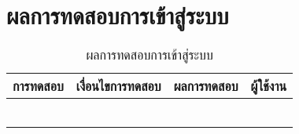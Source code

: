 \section{ผลการทดสอบการเข้าสู่ระบบ}
\begin{table}[H]
	\caption{ผลการทดสอบการเข้าสู่ระบบ}
    \centering	
	\label{tab:test3}
    \begin{tabular}{ | p{4cm} | p{4cm} | p{4cm} | p{2cm} | }
		\hline
	\multicolumn{1}{|c|}{การทดสอบ} & \multicolumn{1}{c|}{เงื่อนไขการทดสอบ} & \multicolumn{1}{c|}{ผลการทดสอบ} & \multicolumn{1}{c|}{ผู้ใช้งาน}                             \\ \hline
	\setstretch{1.0}{ทดสอบการเข้าสู่ระบบ}
	& \setstretch{1.0}{ผู้ใช้เข้ามาในหน้าเข้าสู่ระบบ}
	& \setstretch{1.0}{ระบบแสดงหน้าเข้าสู่ระบบ} 
	&\setstretch{1.0}{\begin{flushleft}ผู้ใช้งาน\end{flushleft}} \\ \cline{2-3} 
	& \setstretch{1.0}{ผู้ใช้กดปุ่มเข้าสู่ระบบ โดยไม่กรอก username และ password } 
	& \setstretch{1.0}{ระบบแสดงข้อความบอกผู้ใช้ว่า “กรุณากรอกชื่อผู้ใช้หรือรหัสผ่านให้ถูกต้อง”} 
	&\setstretch{1.0}{}\\ \cline{2-3} 
	& \setstretch{1.0}{ผู้ใช้กดเข้าสู่ระบบโดยกรอก username ไม่ถูกต้อง}  
	& \setstretch{1.0}{ระบบแสดงข้อความบอกผู้ใช้ว่า “กรุณากรอกชื่อผู้ใช้หรือรหัสผ่านให้ถูกต้อง”} 
	&\setstretch{1.0}{}\\ \cline{2-3} 
	& \setstretch{1.0}{ผู้ใช้กดเข้าสู่ระบบโดยกรอก username ถูกต้องแต่กรอก password ไม่ถูกต้อง} 
	& \setstretch{1.0}{ระบบแสดงข้อความบอกผู้ใช้ว่า “กรุณากรอกชื่อผู้ใช้หรือรหัสผ่านให้ถูกต้อง”} 
	&\setstretch{1.0}{}\\ \cline{2-3}
	& \setstretch{1.0}{ผู้ใช้กดเข้าสู่ระบบโดยกรอก username และ password ถูกต้องและมีชื่อเล่น รูปประจำตัว อายุ เบอร์โทรศัพท์} 
	& \setstretch{1.0}{ระบบแสดงข้อความบอกผู้ใช้ว่า “เข้าสู่ระบบสำเร็จ” และจะแสดงชื่อผู้ใช้และรูปโปรไฟล์ที่แถบบนด้านขวา} 
	&\setstretch{1.0}{}\\ \cline{2-3}\hline
	& \setstretch{1.0}{ผู้ใช้กดเข้าสู่ระบบโดยกรอก username และ password ถูกต้องและไม่มีมีชื่อเล่น รูปประจำตัว อายุ เบอร์โทรศัพท์} 
	& \setstretch{1.0}{ระบบแสดงข้อความบอกผู้ใช้ว่า “เข้าสู่ระบบสำเร็จ” และแสดงหน้าให้เพิ่มรูปประจำตัว} 
	&\setstretch{1.0}{}\\ \cline{2-3}\hline
    \end{tabular}
\end{table}


